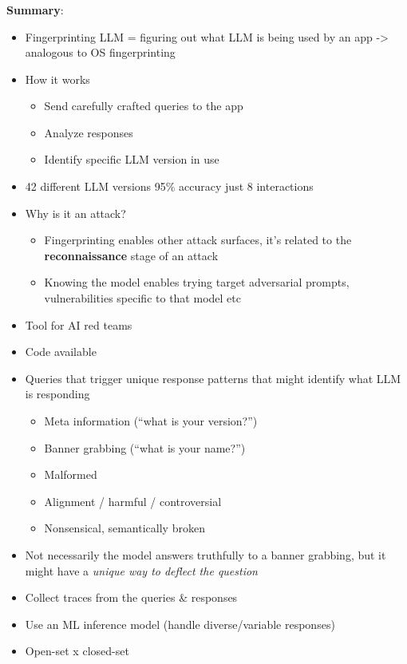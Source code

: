 \documentclass[
  letterpaper,
  DIV=11,
  numbers=noendperiod]{scrartcl}
\providecommand{\tightlist}{%
  \setlength{\itemsep}{0pt}\setlength{\parskip}{0pt}}
\begin{document}
\subsubsection{\texorpdfstring{\autocite{PasquiniKA25_LLMmap}}{{[}@PasquiniKA25\_LLMmap{]}}}\label{pasquinika25_llmmap}

\textbf{Summary}:

\begin{itemize}
\tightlist
\item
  Fingerprinting LLM = figuring out what LLM is being used by an app
  -\textgreater{} analogous to OS fingerprinting
\item
  How it works

  \begin{itemize}
  \tightlist
  \item
    Send carefully crafted queries to the app
  \item
    Analyze responses
  \item
    Identify specific LLM version in use
  \end{itemize}
\item
  42 different LLM versions 95\% accuracy just 8 interactions
\item
  Why is it an attack?

  \begin{itemize}
  \tightlist
  \item
    Fingerprinting enables other attack surfaces, it's related to the
    \textbf{reconnaissance} stage of an attack
  \item
    Knowing the model enables trying target adversarial prompts,
    vulnerabilities specific to that model etc
  \end{itemize}
\item
  Tool for AI red teams
\item
  Code available
\item
  Queries that trigger unique response patterns that might identify what
  LLM is responding

  \begin{itemize}
  \tightlist
  \item
    Meta information (``what is your version?'')
  \item
    Banner grabbing (``what is your name?'')
  \item
    Malformed
  \item
    Alignment / harmful / controversial
  \item
    Nonsensical, semantically broken
  \end{itemize}
\item
  Not necessarily the model answers truthfully to a banner grabbing, but
  it might have a \emph{unique way to deflect the question}
\item
  Collect traces from the queries \& responses
\item
  Use an ML inference model (handle diverse/variable responses)
\item
  Open-set x closed-set


\end{itemize}
\end{document}
